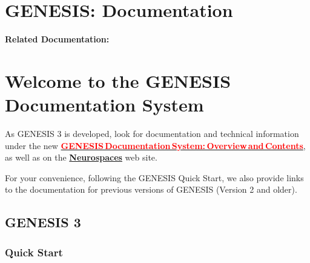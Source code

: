 \documentclass[12pt]{article}
\begin{document}
\section*{GENESIS: Documentation}

{\bf Related Documentation:}

\section*{Welcome to the GENESIS Documentation System}

As GENESIS 3 is developed, look for documentation and technical information under the new \href{../documentation-overview/documentation-overview.tex}{\textcolor{red}{\bf GENESIS\,Documentation\,System:\,Overview\,and\,Contents}}, as well as on the \href{http://www.neurospaces.org}{\bf Neurospaces} web site.

For your convenience, following the GENESIS Quick Start, we also provide links to the documentation for previous versions of GENESIS (Version 2 and older).

\subsection*{GENESIS 3}

\subsubsection*{Quick Start}
\end{document}
